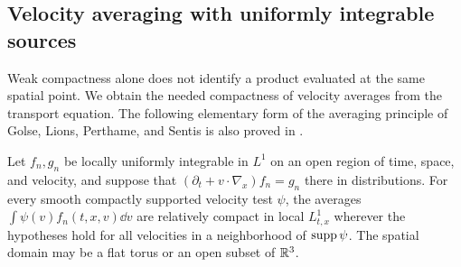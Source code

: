 \subsection{Velocity averaging with uniformly integrable sources}

Weak compactness alone does not identify a product evaluated at the
same spatial point. We obtain the needed compactness of velocity
averages from the transport equation. The following elementary form of
the averaging principle of Golse, Lions, Perthame, and Sentis
\cite{GolseLionsPerthameSentis1988} is also proved in
\cite[Section~6]{OpenAIPeriodic}.

\begin{lemma}\label{comp:averaging}
Let $f_n,g_n$ be locally uniformly integrable in $L^1$ on an open
region of time, space, and velocity, and suppose that
$(\partial_t+v\cdot\nabla_x)f_n=g_n$ there in distributions.
For every smooth compactly supported velocity test $\psi$, the averages
$\int\psi(v)f_n(t,x,v)\dd v$ are relatively compact in local
$L^1_{t,x}$ wherever the hypotheses hold for all velocities in a
neighborhood of $\operatorname{supp}\psi$.
The spatial domain may be a flat torus or an open subset of $\mathbb R^3$.
\end{lemma}

